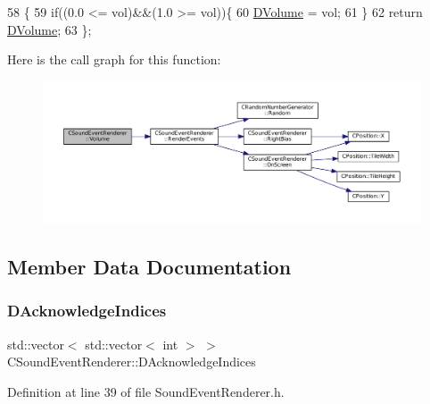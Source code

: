 \begin{DoxyCode}
58                              \{
59             \textcolor{keywordflow}{if}((0.0 <= vol)&&(1.0 >= vol))\{
60                 \hyperlink{classCSoundEventRenderer_a3812aeb93aef90635a7da72fc101c686}{DVolume} = vol;   
61             \}
62             \textcolor{keywordflow}{return} \hyperlink{classCSoundEventRenderer_a3812aeb93aef90635a7da72fc101c686}{DVolume};
63         \};
\end{DoxyCode}
Here is the call graph for this function\+:
\nopagebreak
\begin{figure}[H]
\begin{center}
\leavevmode
\includegraphics[width=350pt]{classCSoundEventRenderer_a7266c3416291f3802d6f3476a29285a2_cgraph}
\end{center}
\end{figure}


\subsection{Member Data Documentation}
\hypertarget{classCSoundEventRenderer_ad52a927e172ab9a00dbf1f707e1fb724}{}\label{classCSoundEventRenderer_ad52a927e172ab9a00dbf1f707e1fb724} 
\subsubsection{\texorpdfstring{D\+Acknowledge\+Indices}{DAcknowledgeIndices}}
{\footnotesize\ttfamily std\+::vector$<$ std\+::vector$<$ int $>$ $>$ C\+Sound\+Event\+Renderer\+::\+D\+Acknowledge\+Indices\hspace{0.3cm}{\ttfamily [protected]}}



Definition at line 39 of file Sound\+Event\+Renderer.\+h.

\hypertarget{classCSoundEventRenderer_a5ffc7dd4911c09c23987c6d1a8776c26}{}\label{classCSoundEventRenderer_a5ffc7dd4911c09c23987c6d1a8776c26} 
